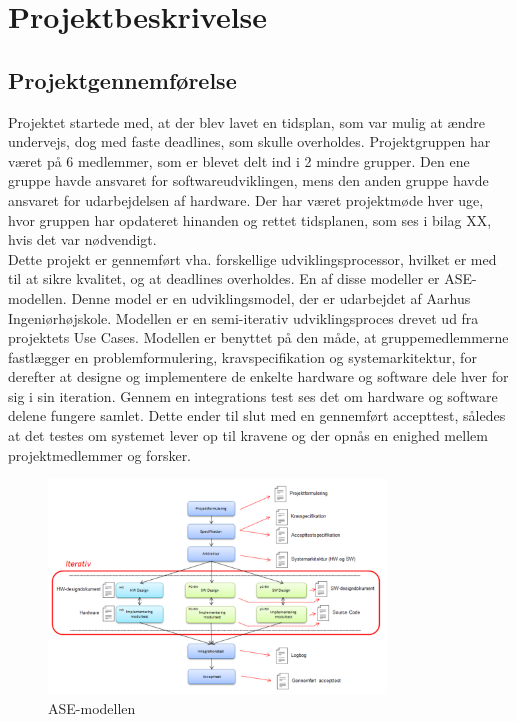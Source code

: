 \chapter{Projektbeskrivelse}
\section{Projektgennemførelse}
Projektet startede med, at der blev lavet en tidsplan, som var mulig at ændre undervejs, dog med faste deadlines, som skulle overholdes. Projektgruppen har været på 6 medlemmer, som er blevet delt ind i 2 mindre grupper. Den ene gruppe havde ansvaret for softwareudviklingen, mens den anden gruppe havde ansvaret for udarbejdelsen af hardware. Der har været projektmøde hver uge, hvor gruppen har opdateret hinanden og rettet tidsplanen, som ses i bilag XX, hvis det var nødvendigt.\\
\newline 
Dette projekt er gennemført vha. forskellige udviklingsprocessor, hvilket er med til at sikre kvalitet, og at deadlines overholdes. En af disse modeller er ASE-modellen. Denne model er en udviklingsmodel, der er udarbejdet af Aarhus Ingeniørhøjskole. Modellen er en semi-iterativ udviklingsproces drevet ud fra projektets Use Cases. Modellen er benyttet på den måde, at gruppemedlemmerne fastlægger en problemformulering, kravspecifikation og systemarkitektur, for derefter at designe og implementere de enkelte hardware og software dele hver for sig i sin iteration. Gennem en integrations test ses det om hardware og software delene fungere samlet.  
Dette ender til slut med en gennemført accepttest, således at det testes om systemet lever op til kravene og der opnås en enighed mellem projektmedlemmer og forsker.
\begin{figure}[H]
	\centering
	\includegraphics[width=0.8\textwidth]{Figurer/AseModellen}
	\caption{ASE-modellen}
	\label{fig:ASE_model}
\end{figure}
